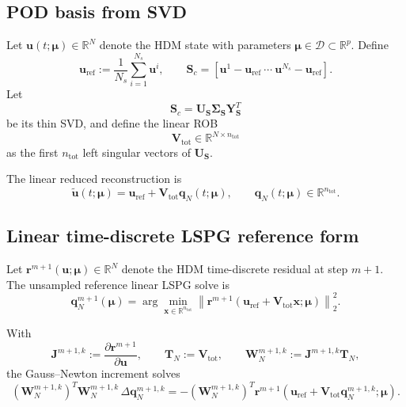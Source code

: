 \documentclass[11pt]{article}
\begin{document}
\subsection{POD basis from SVD}
Let $\mathbf u(t;\bm\mu)\in\mathbb R^N$ denote the HDM state with parameters $\bm\mu\in\mathcal D\subset\mathbb R^p$. Define
\begin{equation}
\mathbf u_{\mathrm{ref}}:=\frac{1}{N_s}\sum_{i=1}^{N_s}\mathbf u^i,
\qquad
\mathbf S_c=[\mathbf u^1-\mathbf u_{\mathrm{ref}}\ \cdots\ \mathbf u^{N_s}-\mathbf u_{\mathrm{ref}}].
\end{equation}
Let
\begin{equation}
\mathbf S_c=\mathbf U_{\mathbf S}\mathbf\Sigma_{\mathbf S}\mathbf Y_{\mathbf S}^T
\end{equation}
be its thin SVD, and define the linear ROB
\begin{equation}
\mathbf V_{\mathrm{tot}}\in\mathbb R^{N\times n_{\mathrm{tot}}}
\end{equation}
as the first $n_{\mathrm{tot}}$ left singular vectors of $\mathbf U_{\mathbf S}$.

The linear reduced reconstruction is
\begin{equation}
\tilde{\mathbf u}(t;\bm\mu)=\mathbf u_{\mathrm{ref}}+\mathbf V_{\mathrm{tot}}\mathbf q_N(t;\bm\mu),
\qquad
\mathbf q_N(t;\bm\mu)\in\mathbb R^{n_{\mathrm{tot}}}.
\label{eq:linear-reconstruction}
\end{equation}

\subsection{Linear time-discrete LSPG reference form}
Let $\mathbf r^{m+1}(\mathbf u;\bm\mu)\in\mathbb R^N$ denote the HDM time-discrete residual at step $m{+}1$. The unsampled reference linear LSPG solve is
\begin{equation}
\mathbf q_N^{m+1}(\bm\mu)
=
\arg\min_{\mathbf x\in\mathbb R^{n_{\mathrm{tot}}}}
\left\|
\mathbf r^{m+1}\!\left(\mathbf u_{\mathrm{ref}}+\mathbf V_{\mathrm{tot}}\mathbf x;\bm\mu\right)
\right\|_2^2.
\label{eq:linear-lspg-min}
\end{equation}

With
\begin{equation}
\mathbf J^{m+1,k}:=\frac{\partial\mathbf r^{m+1}}{\partial\mathbf u},
\qquad
\mathbf T_N:=\mathbf V_{\mathrm{tot}},
\qquad
\mathbf W_N^{m+1,k}:=\mathbf J^{m+1,k}\mathbf T_N,
\end{equation}
the Gauss--Newton increment solves
\begin{equation}
(\mathbf W_N^{m+1,k})^T\mathbf W_N^{m+1,k}\,\Delta\mathbf q_N^{m+1,k}
=
-(\mathbf W_N^{m+1,k})^T
\mathbf r^{m+1}\!\left(\mathbf u_{\mathrm{ref}}+\mathbf V_{\mathrm{tot}}\mathbf q_N^{m+1,k};\bm\mu\right).
\label{eq:linear-gn-update}
\end{equation}
\end{document}
